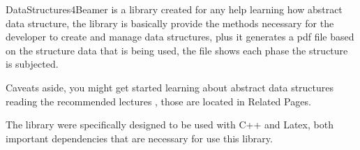 Data\-Structures4\-Beamer is a library created for any help learning how abstract data structure, the library is basically provide the methods necessary for the developer to create and manage data structures, plus it generates a pdf file based on the structure data that is being used, the file shows each phase the structure is subjected.

Caveats aside, you might get started learning about abstract data structures reading the recommended lectures , those are located in Related Pages.

The library were specifically designed to be used with C++ and Latex, both important dependencies that are necessary for use this library. 